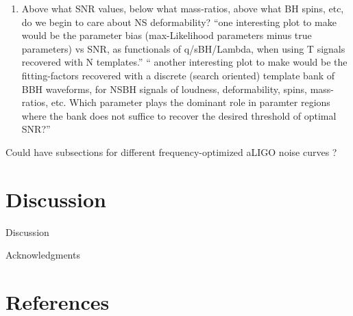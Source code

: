 \documentclass[aps,prd,amsmath,floats,floatfix, twocolumn,
superscriptaddress,nofootinbib,showpacs]{revtex4-1}
\newcommand{\prayush}{\textcolor{red!40!black}}
\begin{document}
\begin{enumerate}
\item Above what SNR values, below what mass-ratios, above what BH spins, etc, 
do we begin to care about NS deformability?\newline
``one interesting plot to make would be the parameter bias (max-Likelihood
parameters minus true parameters) vs SNR, as functionals of q/sBH/Lambda, when
using T signals recovered with N templates.''\newline
`` another interesting plot to make would be the fitting-factors recovered with
a discrete (search oriented) template bank of BBH waveforms, for NSBH signals of
loudness, deformability, spins, mass-ratios, etc. Which parameter plays the 
dominant role in paramter regions where the bank does not suffice to recover
the desired threshold of optimal SNR?''
\end{enumerate}


\prayush{Could have subsections for different frequency-optimized aLIGO noise curves ?}

\hspace{5mm}

















\section{Discussion}
Discussion

\begin{acknowledgments}
Acknowledgments
\end{acknowledgments}

\section*{References}

\end{document}
